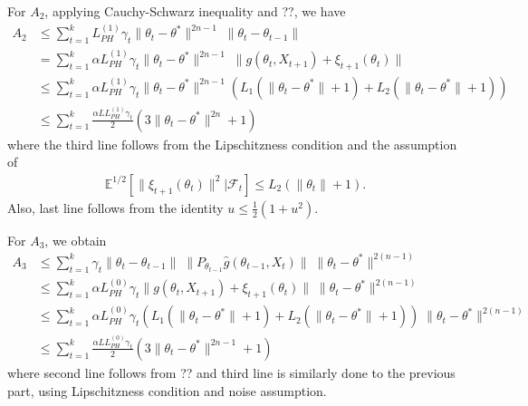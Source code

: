 \documentclass[a4paper]{article}
\newcommand{\norm}[1]{\|#1 \|}
\newcommand{\Exs}{\mathbb{E}}
\newcommand{\thetastar}{\theta^*}
\newcommand{\constLPH}[1]{L_{PH}^{(#1)}}
\newcommand{\stepsize}{\alpha}
\begin{document}
	For $A_{2}$, applying Cauchy-Schwarz inequality and ??, we have
	\begin{align*}
		A_{2} & \leq \sum_{t = 1}^{k}\constLPH{1}\gamma_{t}\norm{\theta_{t} - \thetastar}^{2n - 1} \; \norm{\theta_{t} - \theta_{t - 1}}\\
		& = \sum_{t = 1}^{k}\stepsize \constLPH{1}\gamma_{t}\norm{\theta_{t} - \thetastar}^{2n - 1} \; \norm{g\left(\theta_{t}, X_{t +‌ 1}\right) + \xi_{t + 1}\left(\theta_{t}\right)}\\
		& \leq \sum_{t = 1}^{k}\stepsize \constLPH{1}\gamma_{t}\norm{\theta_{t} - \thetastar}^{2n - 1}\left(L_{1}\left(\norm{\theta_{t} - \thetastar} + 1\right) + L_{2}\left(\norm{\theta_{t} - \thetastar} + 1\right)\right)\\
		& \leq \sum_{t = 1}^{k}\frac{\stepsize L \constLPH{1}\gamma_{t}}{2}\left(3\norm{\theta_{t} - \thetastar}^{2n} + 1\right)
	\end{align*}
	where the third line follows from the Lipschitzness condition and the assumption of
	\begin{align*}
		\Exs^{1 / 2}\left[\norm{\xi_{t + 1}\left(\theta_{t}\right)}^{2} | \mathcal{F}_{t}\right] \leq L_{2}\left(\norm{\theta_{t}} + 1\right).
	\end{align*}
	Also, last line follows from the identity $u \leq \frac{1}{2}\left(1 + u^{2}\right)$.
	
	For $A_{3}$, we obtain
	\begin{align*}
		A_{3} & \leq \sum_{t = 1}^{k}\gamma_{t}\norm{\theta_{t} - \theta_{t - 1}} \; \norm{P_{\theta_{t - 1}}\hat{g}\left(\theta_{t - 1}, X_{t}\right)} \; \norm{\theta_{t} - \thetastar}^{2(n - 1)}\\
		& \leq \sum_{t = 1}^{k}\stepsize \constLPH{0}\gamma_{t}\norm{g\left(\theta_{t}, X_{t + 1}\right) + \xi_{t + 1}\left(\theta_{t}\right)} \; \norm{\theta_{t} - \thetastar}^{2(n - 1)}\\
		& \leq \sum_{t = 1}^{k}\stepsize \constLPH{0}\gamma_{t}\left(L_{1}\left(\norm{\theta_{t} - \thetastar} + 1\right) + L_{2}\left(\norm{\theta_{t} - \thetastar} + 1\right)\right) \; \norm{\theta_{t} - \thetastar}^{2(n - 1)}\\
		& \leq \sum_{t = 1}^{k}\frac{\stepsize L \constLPH{0}\gamma_{t}}{2}\left(3\norm{\theta_{t} - \thetastar}^{2n - 1} + 1\right)
	\end{align*}
	where second line follows from ?? and third line is similarly done to the previous part, using Lipschitzness condition and noise assumption.
	
\end{document}
